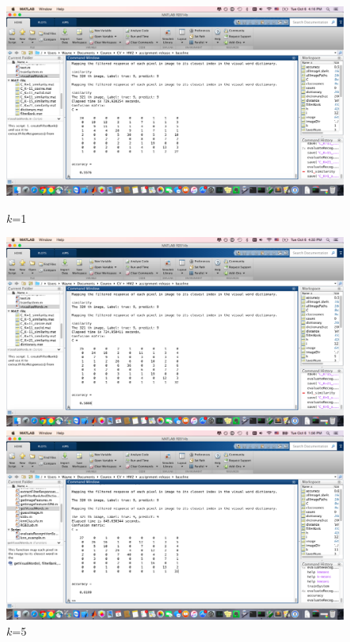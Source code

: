 \documentclass[12pt]{article}
\begin{document}
\begin{figure}[htbp!]
\centering
	\begin{minipage}[t]{0.45 \textwidth}
		\centering \includegraphics[width= \linewidth]{./figures/k=1_similarity} 
		\caption*{$k$=1}
	\end{minipage}
	\begin{minipage}[t]{0.45 \textwidth}
		\centering \includegraphics[width= \linewidth]{./figures/k=5_similarity} 
		\caption*{$k$=5}
	\end{minipage}
	\begin{minipage}[t]{0.45 \textwidth}
		\centering \includegraphics[width= \linewidth]{./figures/k=11_similarity} 

\end{minipage}
\end{figure}
\end{document}
